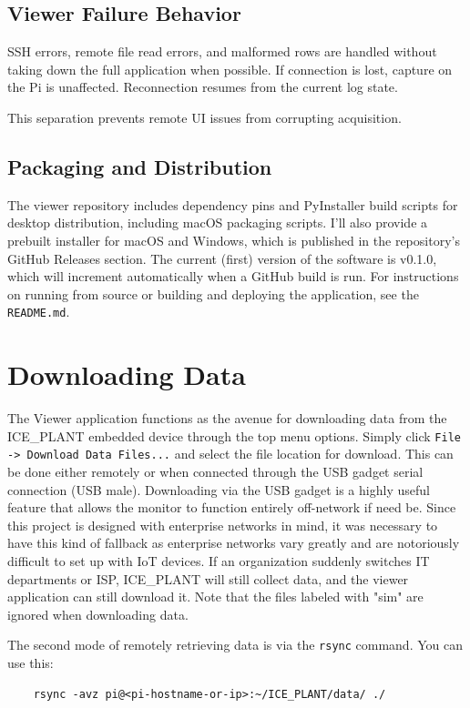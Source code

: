 \documentclass[11pt]{article}
\begin{document}
\subsection*{Viewer Failure Behavior}
SSH errors, remote file read errors, and malformed rows are handled without taking down the full application when possible. If connection is lost, capture on the Pi is unaffected. Reconnection resumes from the current log state.

This separation prevents remote UI issues from corrupting acquisition.

\subsection*{Packaging and Distribution}
The viewer repository includes dependency pins and PyInstaller build scripts for desktop distribution, including macOS packaging scripts. I'll also provide a prebuilt installer for macOS and Windows, which is published in the repository's GitHub Releases section. The current (first) version of the software is v0.1.0, which will increment automatically when a GitHub build is run. For instructions on running from source or building and deploying the application, see the \texttt{README.md}.

\section{Downloading Data}
The Viewer application functions as the avenue for downloading data from the ICE\_PLANT embedded device through the top menu options. Simply click \texttt{File -> Download Data Files...} and select the file location for download. This can be done either remotely or when connected through the USB gadget serial connection (USB male). Downloading via the USB gadget is a highly useful feature that allows the monitor to function entirely off-network if need be. Since this project is designed with enterprise networks in mind, it was necessary to have this kind of fallback as enterprise networks vary greatly and are notoriously difficult to set up with IoT devices. If an organization suddenly switches IT departments or ISP, ICE\_PLANT will still collect data, and the viewer application can still download it. Note that the files labeled with "sim" are ignored when downloading data.

The second mode of remotely retrieving data is via the \texttt{rsync} command. You can use this: 
\begin{verbatim}
    rsync -avz pi@<pi-hostname-or-ip>:~/ICE_PLANT/data/ ./
\end{verbatim}  
\end{document}
